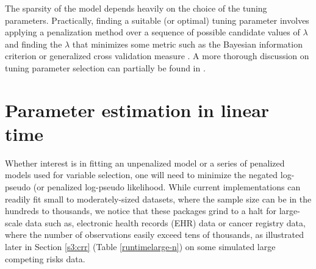 The sparsity of the model depends heavily on the choice of the tuning parameters. Practically, finding a suitable (or optimal) tuning parameter involves applying a penalization method over a sequence of possible candidate values of $\lambda$ and finding the $\lambda$ that minimizes some metric such as the Bayesian information criterion \citep{schwarz1978estimating} or generalized cross validation measure \citep{craven1978smoothing}. A more thorough discussion on tuning parameter selection can partially be found in 
 \cite{wang2007tuning, zhang2010regularization, wang2011consistent,  fan2013tuning, fu2017penalized, ni2018tuning}.



\section{Parameter estimation in linear time}
\label{s3:scan}
Whether interest is in fitting an unpenalized model or a series of penalized models used for variable selection, one will need to minimize the negated log-pseudo (or penalized log-pseudo likelihood. While current implementations can readily fit small to moderately-sized datasets, where the sample size can be in the hundreds to thousands, we notice that these packages grind to a halt for large-scale data such as, electronic health records (EHR) data or cancer registry data, where the number of observations easily exceed tens of thousands, as illustrated later in  Section \ref{s3:crr} (Table \ref{runtimelarge-n}) on some simulated large competing risks data.

